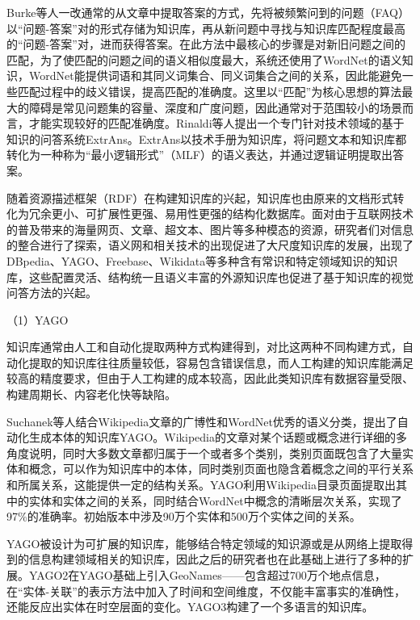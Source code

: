 Burke等人一改通常的从文章中提取答案的方式，先将被频繁问到的问题（FAQ）以“问题-答案”对的形式存储为知识库，再从新问题中寻找与知识库匹配程度最高的“问题-答案”对，进而获得答案。在此方法中最核心的步骤是对新旧问题之间的匹配，为了使匹配的问题之间的语义相似度最大，系统还使用了WordNet的语义知识，WordNet能提供词语和其同义词集合、同义词集合之间的关系，因此能避免一些匹配过程中的歧义错误，提高匹配的准确度。这里以“匹配”为核心思想的算法最大的障碍是常见问题集的容量、深度和广度问题，因此通常对于范围较小的场景而言，才能实现较好的匹配准确度。Rinaldi等人提出一个专门针对技术领域的基于知识的问答系统ExtrAns。ExtrAns以技术手册为知识库，将问题文本和知识库都转化为一种称为“最小逻辑形式”（MLF）的语义表达，并通过逻辑证明提取出答案。

随着资源描述框架（RDF）在构建知识库的兴起，知识库也由原来的文档形式转化为冗余更小、可扩展性更强、易用性更强的结构化数据库。面对由于互联网技术的普及带来的海量网页、文章、超文本、图片等多种模态的资源，研究者们对信息的整合进行了探索，语义网和相关技术的出现促进了大尺度知识库的发展，出现了DBpedia、YAGO、Freebase、Wikidata等多种含有常识和特定领域知识的知识库，这些配置灵活、结构统一且语义丰富的外源知识库也促进了基于知识库的视觉问答方法的兴起。

（1）YAGO

知识库通常由人工和自动化提取两种方式构建得到，对比这两种不同构建方式，自动化提取的知识库往往质量较低，容易包含错误信息，而人工构建的知识库能满足较高的精度要求，但由于人工构建的成本较高，因此此类知识库有数据容量受限、构建周期长、内容老化快等缺陷。

Suchanek等人结合Wikipedia文章的广博性和WordNet优秀的语义分类，提出了自动化生成本体的知识库YAGO。Wikipedia的文章对某个话题或概念进行详细的多角度说明，同时大多数文章都归属于一个或者多个类别，类别页面既包含了大量实体和概念，可以作为知识库中的本体，同时类别页面也隐含着概念之间的平行关系和所属关系，这能提供一定的结构关系。YAGO利用Wikipedia目录页面提取出其中的实体和实体之间的关系，同时结合WordNet中概念的清晰层次关系，实现了97\%的准确率。初始版本中涉及90万个实体和500万个实体之间的关系。

YAGO被设计为可扩展的知识库，能够结合特定领域的知识源或是从网络上提取得到的信息构建领域相关的知识库，因此之后的研究者也在此基础上进行了多种的扩展。YAGO2在YAGO基础上引入GeoNames——包含超过700万个地点信息，在“实体-关联”的表示方法中加入了时间和空间维度，不仅能丰富事实的准确性，还能反应出实体在时空层面的变化。YAGO3构建了一个多语言的知识库。

